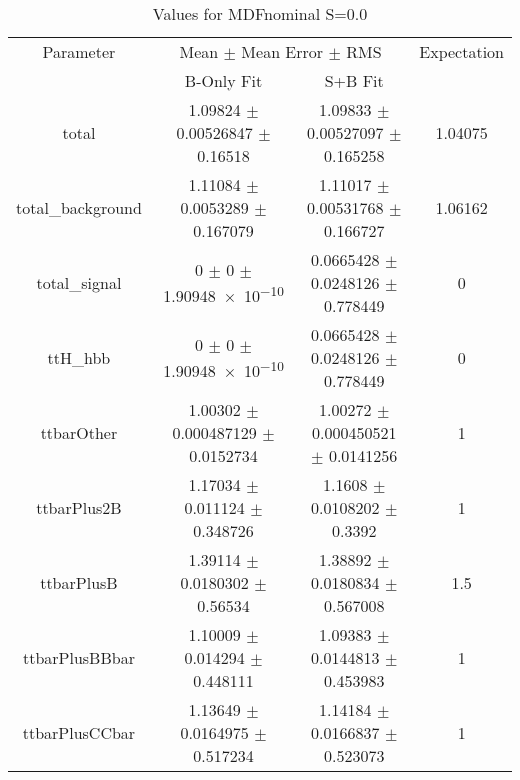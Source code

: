 \begin{table}
\centering
\caption{Values for MDFnominal S=0.0}
\begin{tabular}{cccc}
\toprule
Parameter & \multicolumn{2}{c}{Mean $\pm$ Mean Error $\pm$ RMS} & Expectation\\
 & B-Only Fit & S+B Fit & \\
\midrule
total & \num{1.09824} $\pm$ \num{0.00526847} $\pm$ \num{0.16518} & \num{1.09833} $\pm$ \num{0.00527097} $\pm$ \num{0.165258} & \num{1.04075}\\
total\_background & \num{1.11084} $\pm$ \num{0.0053289} $\pm$ \num{0.167079} & \num{1.11017} $\pm$ \num{0.00531768} $\pm$ \num{0.166727} & \num{1.06162}\\
total\_signal & \num{0} $\pm$ \num{0} $\pm$ \num{1.90948e-10} & \num{0.0665428} $\pm$ \num{0.0248126} $\pm$ \num{0.778449} & \num{0}\\
ttH\_hbb & \num{0} $\pm$ \num{0} $\pm$ \num{1.90948e-10} & \num{0.0665428} $\pm$ \num{0.0248126} $\pm$ \num{0.778449} & \num{0}\\
ttbarOther & \num{1.00302} $\pm$ \num{0.000487129} $\pm$ \num{0.0152734} & \num{1.00272} $\pm$ \num{0.000450521} $\pm$ \num{0.0141256} & \num{1}\\
ttbarPlus2B & \num{1.17034} $\pm$ \num{0.011124} $\pm$ \num{0.348726} & \num{1.1608} $\pm$ \num{0.0108202} $\pm$ \num{0.3392} & \num{1}\\
ttbarPlusB & \num{1.39114} $\pm$ \num{0.0180302} $\pm$ \num{0.56534} & \num{1.38892} $\pm$ \num{0.0180834} $\pm$ \num{0.567008} & \num{1.5}\\
ttbarPlusBBbar & \num{1.10009} $\pm$ \num{0.014294} $\pm$ \num{0.448111} & \num{1.09383} $\pm$ \num{0.0144813} $\pm$ \num{0.453983} & \num{1}\\
ttbarPlusCCbar & \num{1.13649} $\pm$ \num{0.0164975} $\pm$ \num{0.517234} & \num{1.14184} $\pm$ \num{0.0166837} $\pm$ \num{0.523073} & \num{1}\\
\bottomrule
\end{tabular}
\end{table}